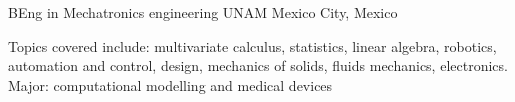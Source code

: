 \begin{cventries}
{\begin{cvitems}
\end{cvitems}
}

\cventry
{BEng in Mechatronics engineering}%
{UNAM} %
{Mexico City, Mexico} %
{}
{ %
\begin{cvitems}
\item[] {Topics covered include: multivariate calculus, statistics, linear algebra, robotics, automation and control, design, mechanics of solids, fluids mechanics,
electronics. Major: computational modelling and medical devices}
\end{cvitems}
}



\end{cventries}